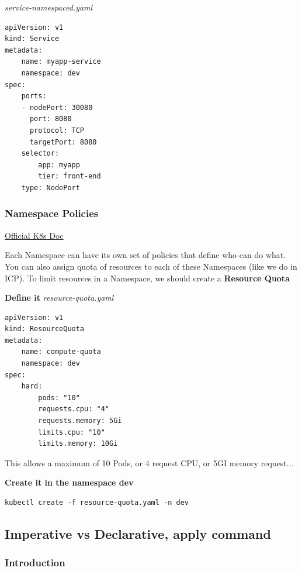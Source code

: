 \documentclass{article}
\newenvironment{codetemplate}[1][]{%
  \mybasecolorbox[#1]
  \itshape
}{%
  \endmybasecolorbox
}
\begin{document}
\begin{codetemplate}{service-namespaced.yaml}
\begin{verbatim}
apiVersion: v1
kind: Service
metadata:
    name: myapp-service
    namespace: dev
spec:
    ports:
    - nodePort: 30080
      port: 8080
      protocol: TCP
      targetPort: 8080
    selector:
        app: myapp
        tier: front-end
    type: NodePort 
\end{verbatim}
\end{codetemplate}

\subsubsection{Namespace Policies}

\href{https://kubernetes.io/docs/concepts/policy/resource-quotas/}{Official K8s Doc}

\label{Quota}
Each Namespace can have its own set of policies that define who can do what. You can also assign quota of resources to each of these Namespaces (like we do in ICP). To limit resources in a Namespace, we should create a \textbf{Resource Quota}

\textbf{Define it}
\begin{codetemplate}{resource-quota.yaml}
\begin{verbatim}
apiVersion: v1
kind: ResourceQuota
metadata:
    name: compute-quota
    namespace: dev
spec:
    hard:
        pods: "10"
        requests.cpu: "4"
        requests.memory: 5Gi
        limits.cpu: "10"
        limits.memory: 10Gi
\end{verbatim}
\end{codetemplate}

This allows a maximum of 10 Pods, or 4 request CPU, or 5GI memory request...

\textbf{Create it in the namespace dev}
\begin{codetemplate}{}
\begin{verbatim}
kubectl create -f resource-quota.yaml -n dev
\end{verbatim}
\end{codetemplate}

\subsection{Imperative vs Declarative, apply command}

\subsubsection{Introduction}
\end{document}
